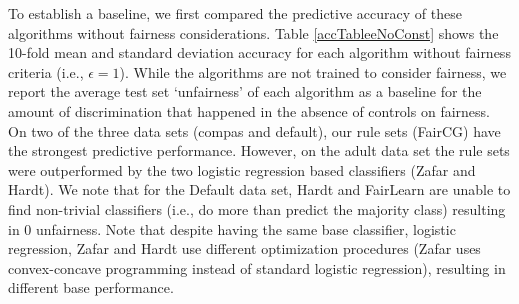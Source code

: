 \documentclass[twoside,11pt]{article}
\begin{document}
 To establish a baseline, we first compared the predictive accuracy of these algorithms without fairness considerations. Table \ref{accTableeNoConst} shows the 10-fold mean and standard deviation accuracy for each algorithm without fairness criteria (i.e., $\epsilon = 1$). While the algorithms are not trained to consider fairness, we report the average test set `unfairness' of each algorithm as a baseline for the amount of discrimination that happened in the absence of controls on fairness. On two of the three data sets (compas and default), our rule sets (FairCG) have the strongest predictive performance. However, on the adult data set the rule sets were outperformed by the two logistic regression based classifiers (Zafar and Hardt). We note that for the Default data set, Hardt and FairLearn are unable to find non-trivial classifiers (i.e., do more than predict the majority class) resulting in 0 unfairness. Note that despite having the same base classifier, logistic regression, Zafar and Hardt use different optimization procedures (Zafar uses convex-concave programming instead of standard logistic regression), resulting in different base performance. 
    
\end{document}
